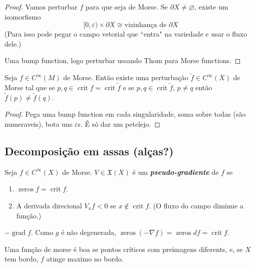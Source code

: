 \begin{proof}\leavevmode
Vamos perturbar \(f\) para que seja de Morse. Se \(\partial X \neq \varnothing\), existe um isomorfismo
\[[0,\varepsilon) \times\partial X \cong \text{vizinhança de \(\partial X\)} \]
(Para isso pode pegar o campo vetorial que ``entra" na variedade e usar o fluxo dele.)


Uma bump function, logo perturbar ussando Thom para Morse functions.
\end{proof}

\begin{lemma}\leavevmode
Seja \(f \in C^\infty (M)\) de Morse. Então existe uma perturbação \(\tilde{f}\in C^\infty(X)\) de Morse tal que se \(p,q \in \operatorname{crit}f = \operatorname{crit}\tilde{f}\) e se \( p, q \in \operatorname{crit}\tilde{f}\), \(p \neq  q\) então \(\tilde{f}(p) \neq  \tilde{f}(q)\).
\end{lemma}

\begin{proof}\leavevmode
Pega uma bump function em cada singularidade, soma sobre todas (são numeraveis), bota uns \(\varepsilon\)s. É só dar um petelejo.
\end{proof}

\subsection{Decomposição em assas (alças?)}

\begin{defn}\leavevmode
Seja \(f \in C^\infty(X)\) de Morse. \(V \in \mathfrak{X}(X)\) é um \textit{\textbf{pseudo-gradiente}} de \(f\) se 
\begin{enumerate}
\item \(\operatorname{ze r o s}f= \operatorname{crit}f\).
\item A derivada direcional \(V_xf<0\) se  \(x \not \in \operatorname{crit}f\). (O fluxo do campo diminue a função.)
\end{enumerate}
\end{defn}

\begin{example}\leavevmode
\(-\operatorname{gr a d} f\). Como \(g\) é não degenerada, \(\operatorname{ z e r o s}(-\nabla f)=\operatorname{ z e r o s}df=\operatorname{crit}f\).
\end{example}

Uma função de morse é boa  se pontos críticos com preimagens diferents, e, se \(X\) tem bordo, \(f\) atinge maximo no bordo.

